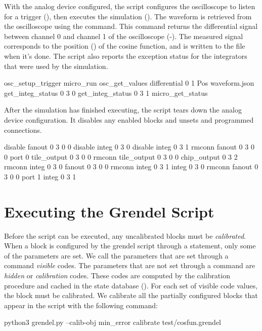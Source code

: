 With the analog device configured, the \grendel script configures the
oscilloscope to listen for a trigger (), then executes
the simulation (). The waveform is retrieved from the oscilloscope using the
 command. This command returns the differential signal
between channel 0 and channel 1 of the oscilloscope (-). The
measured signal corresponds to the position () of the cosine function,
and is written to the  file when it's done. The \grendel
script also reports the exception status for the integrators that were used by
the simulation. 

\begin{snippet}
osc_setup_trigger
micro_run
osc_get_values differential 0 1 Pos waveform.json
get_integ_status 0 3 0
get_integ_status 0 3 1
micro_get_status
\end{snippet}

After the simulation has finished executing, the \grendel script tears down the
analog device configuration. It disables any enabled blocks and unsets and
programmed connections.

\begin{snippet}
disable fanout 0 3 0 0
disable integ 0 3 0
disable integ 0 3 1
rmconn fanout 0 3 0 0 port 0 tile_output 0 3 0 0
rmconn tile_output 0 3 0 0 chip_output 0 3 2
rmconn integ 0 3 0 fanout 0 3 0 0
rmconn integ 0 3 1 integ 0 3 0
rmconn fanout 0 3 0 0 port 1 integ 0 3 1
\end{snippet}

\section{Executing the Grendel Script}

Before the  script can be executed, any uncalibrated blocks
must be \textit{calibrated}. When a block is configured by the grendel script
through a  statement, only some of the parameters are set. We call the
parameters that are set through a \grendel command \textit{visible} codes. The
parameters that are not set through a \grendel command are \textit{hidden}
or \textit{calibration} codes. These codes are computed by the calibration
procedure and cached in the state database (). For each set of
visible code values, the block must be calibrated. We calibrate all the
partially configured blocks that appear in the  script with the
following command:


\begin{snippet}
python3 grendel.py --calib-obj min_error calibrate test/cosfun.grendel
\end{snippet}

